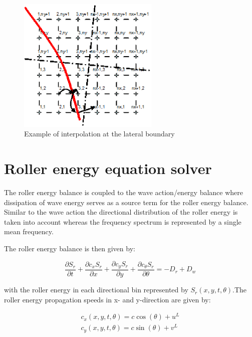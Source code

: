 \begin{figure}[h]
  \centering
  \includegraphics[width=0.6\textwidth]{image7}
  \caption{Example of interpolation at the lateral boundary}
  \label{fig:image7}
\end{figure}


\section{ Roller energy equation solver}

The roller energy balance is coupled to the wave action/energy balance where dissipation of wave energy serves as a source term for the roller energy balance. Similar to the wave action the directional distribution of the roller energy is taken into account whereas the frequency spectrum is represented by a single mean frequency. 

The roller energy balance is then given by:

\begin{equation} \label{2.33)} 
\frac{\partial S_{r} }{\partial t} +\frac{\partial c_{x} S_{r} }{\partial x} +\frac{\partial c_{y} S_{r} }{\partial y} +\frac{\partial c_{\theta } S_{r} }{\partial \theta } =-D_{r} +D_{w}  
\end{equation} 

with the roller energy in each directional bin represented by $S_{r} (x,y,t,\theta )$.The roller energy propagation speeds in x- and y-direction are given by:

\begin{equation} \label{2.34)} 
\begin{array}{l} {c_{x} (x,y,t,\theta )=c\cos (\theta )+u^{L} } \\ {c_{y} (x,y,t,\theta )=c\sin (\theta )+v^{L} } \end{array} 
\end{equation} 


